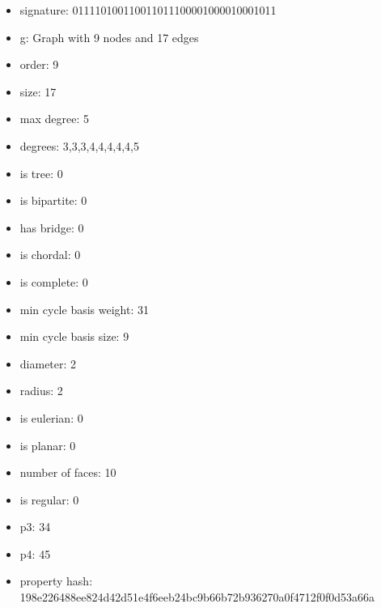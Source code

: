 \newpage
\begin{figure}
\end{figure}
\begin{itemize}
\item signature: 011110100110011011100001000010001011
\item g: Graph with 9 nodes and 17 edges
\item order: 9
\item size: 17
\item max degree: 5
\item degrees: 3,3,3,4,4,4,4,4,5
\item is tree: 0
\item is bipartite: 0
\item has bridge: 0
\item is chordal: 0
\item is complete: 0
\item min cycle basis weight: 31
\item min cycle basis size: 9
\item diameter: 2
\item radius: 2
\item is eulerian: 0
\item is planar: 0
\item number of faces: 10
\item is regular: 0
\item p3: 34
\item p4: 45
\item property hash: 198e226488ee824d42d51e4f6eeb24bc9b66b72b936270a0f4712f0f0d53a66a
\end{itemize}
